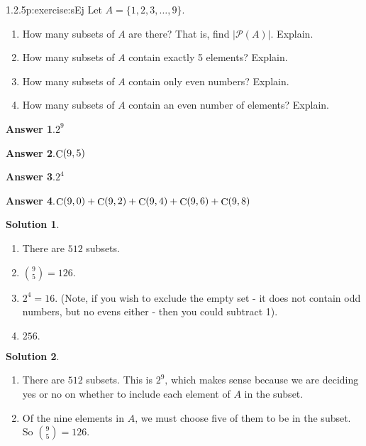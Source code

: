\documentclass[twoside,11pt,]{book}
\newcommand{\blocktitlefont}{\relax}
\numberwithin{equation}{chapter}
\newcommand{\pow}{\mathcal P}
\begin{document}
\begin{divisionsolution}{1.2.5}{}{p:exercise:sEj}%
Let \(A = \{1,2,3,\ldots,9\}\text{.}\)%
\begin{enumerate}[label=(\alph*)]
\item{}How many subsets of \(A\) are there? That is, find \(|\pow(A)|\text{.}\) Explain.%
\item{}How many subsets of \(A\) contain exactly 5 elements? Explain.%
\item{}How many subsets of \(A\) contain only even numbers? Explain.%
\item{}How many subsets of \(A\) contain an even number of elements? Explain.%
\end{enumerate}
%
\par\smallskip%
\noindent\textbf{\blocktitlefont Answer 1}.\quad{}\(2^{9}\)%
\par\smallskip%
\noindent\textbf{\blocktitlefont Answer 2}.\quad{}\(\mathop{\rm C}\nolimits\!\left(9,5\right)\)%
\par\smallskip%
\noindent\textbf{\blocktitlefont Answer 3}.\quad{}\(2^{4}\)%
\par\smallskip%
\noindent\textbf{\blocktitlefont Answer 4}.\quad{}\(\mathop{\rm C}\nolimits\!\left(9,0\right)+\mathop{\rm C}\nolimits\!\left(9,2\right)+\mathop{\rm C}\nolimits\!\left(9,4\right)+\mathop{\rm C}\nolimits\!\left(9,6\right)+\mathop{\rm C}\nolimits\!\left(9,8\right)\)%
\par\smallskip%
\noindent\textbf{\blocktitlefont Solution 1}.\quad{}%
\begin{enumerate}[label=(\alph*)]
\item{}There are \(512\) subsets.%
\item{}\({9 \choose 5} = 126\text{.}\)%
\item{}\(2^4 = 16\text{.}\) (Note, if you wish to exclude the empty set - it does not contain odd numbers, but no evens either - then you could subtract 1).%
\item{}\(256\text{.}\)%
\end{enumerate}
%
\par\smallskip%
\noindent\textbf{\blocktitlefont Solution 2}.\quad{}%
\begin{enumerate}[label=(\alph*)]
\item{}There are \(512\) subsets. This is \(2^9\text{,}\) which makes sense because we are deciding yes or no on whether to include each element of \(A\) in the subset.%
\item{}Of the nine elements in \(A\text{,}\) we must choose five of them to be in the subset. So \({9 \choose 5} = 126\text{.}\)%

\end{enumerate}
\end{divisionsolution}
\end{document}

